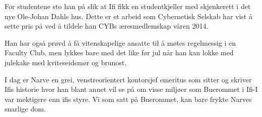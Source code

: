 For studentene sto han på slik at Ifi fikk en studentkjeller med skjenkerett i det nye Ole-Johan Dahls hus. Dette er et arbeid som Cybernetisk Selskab har vist å sette pris på ved å tildele han CYBs æresmedlemskap våren 2014.

Han har også prøvd å få vitenskapelige ansatte til å møtes regelmessig i en Faculty Club, men lykkes bare med det like før jul når han kan lokke med julekake med kviteseidsmør og brunost.

I dag er Narve en grei, venstreorientert kontorsjef emeritus som sitter og skriver Ifis historie hvor han blant annet vil se på om visse miljøer som Buerommet i Ifi-I var mektigere enn ifis styre. Vi som satt på Buerommet, kan bare frykte Narves snarlige dom.
